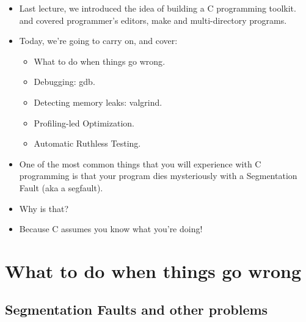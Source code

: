 \documentclass[aspectratio=169]{beamer}
\newcommand{\pitem}{\pause \item}
\begin{document}
\begin{frame}[fragile]
  \begin{itemize}
    \item
      Last lecture, we introduced the idea of building a
      \alert{C programming toolkit}.
      and covered programmer's editors, make and multi-directory programs.

    \pitem
      Today, we're going to carry on, and cover:
      \begin{itemize}
      \item
        \alert{What to do when things go wrong}.
      \item
        \alert{Debugging: gdb}.
      \pitem
        \alert{Detecting memory leaks: valgrind}.
      \pitem
        \alert{Profiling-led Optimization}.
      \pitem
        \alert{Automatic Ruthless Testing}.
    \end{itemize}


    \pitem
    One of the most common things that you will experience with C programming
    is that your program dies mysteriously with a \alert{Segmentation Fault} (aka a \alert{segfault}).
    
    \item
    Why is that?

    \pitem
    \alert{Because C assumes you know what you're doing}!

  \end{itemize}
\end{frame}

\section{What to do when things go wrong}
\subsection{Segmentation Faults and other problems}
\end{document}
